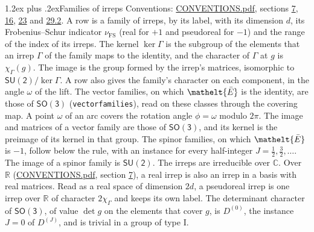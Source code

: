\documentclass[10pt,a4paper]{article}
\makeatletter
\renewcommand\section{\@startsection{section}{1}{\z@}{-3ex plus -1ex minus -.2ex}%
  {1.2ex plus .2ex}{\normalfont\large\sffamily\bfseries\color{parttitle}}}
\numberwithin{equation}{section}
\newcommand{\eltfont}[1]{{\let\sigma\eltsigma\mathelt{#1}}}
\newcommand{\grp}[1]{\mathsf{#1}}
\newcommand{\elt}[1]{\eltfont{#1}}
\newcommand{\irrJ}[1]{D^{(#1)}}
\newcommand{\irchar}[1]{\chi_{#1}}
\newcommand{\fsind}{\nu_{\mathrm{FS}}}
\newcommand{\barred}[1]{\bar{#1}}
\makeatother
\begin{document}
\section{Families of irreps}\label{s:families}
Conventions: \href{../../CONVENTIONS.pdf}{CONVENTIONS.pdf}, sections \href{../../../rotation/CONVENTIONS.pdf\#conv.7}{7}, \href{../../../rotation/CONVENTIONS.pdf\#conv.16}{16}, \href{../../CONVENTIONS.pdf\#conv.23}{23} and \href{../../CONVENTIONS.pdf\#conv.29.2}{29.2}.
\leavevmode\label{n:head.family.irreps}\label{n:index.dimension}\label{n:index.frobenius}\label{n:head.index.family}A row is a family of irreps, by its label, with its dimension $d$, its Frobenius--Schur indicator $\fsind$ (real for $+1$ and pseudoreal for $-1$) and the range of the index of its irreps. \label{n:head.kernel}\label{n:function.character}The kernel $\ker\Gamma$ is the subgroup of the elements that an irrep $\Gamma$ of the family maps to the identity, and the character of $\Gamma$ at $g$ is $\irchar{\Gamma}(g)$. \label{n:head.image}The image is the group formed by the irrep's matrices, isomorphic to $\grp{SU(2)}/\ker\Gamma$. A row also gives the family's character on each component, in the angle $\omega$ of the lift. The vector families, on which $\elt{\barred{E}}$ is the identity, are those of \href{../../../rotation/data/pdf/SO3.pdf}{$\grp{SO(3)}$} (\texttt{vectorfamilies}), read on these classes through the covering map. A point $\omega$ of an arc covers the rotation angle $\phi = \omega$ modulo $2\pi$. The image and matrices of a vector family are those of \href{../../../rotation/data/pdf/SO3.pdf}{$\grp{SO(3)}$}, and its kernel is the preimage of its kernel in that group. The spinor families, on which $\elt{\barred{E}}$ is $-1$, follow below the rule, with an instance for every half-integer $J = \tfrac{1}{2}, \tfrac{3}{2}, \dots$. The image of a spinor family is $\grp{SU(2)}$. The irreps are irreducible over $\mathbb{C}$. Over $\mathbb{R}$ (\href{../../CONVENTIONS.pdf}{CONVENTIONS.pdf}, section \href{../../../rotation/CONVENTIONS.pdf\#conv.7}{7}), a real irrep is also an irrep in a basis with real matrices. Read as a real space of dimension $2d$, a pseudoreal irrep is one irrep over $\mathbb{R}$ of character $2\irchar{\Gamma}$ and keeps its own label. The determinant character of \href{../../../rotation/data/pdf/SO3.pdf}{$\grp{SO(3)}$}, of value $\det g$ on the elements that cover $g$, is $\irrJ{0}$, the instance $J = 0$ of $\irrJ{J}$, and is trivial in a group of type I.
\end{document}
